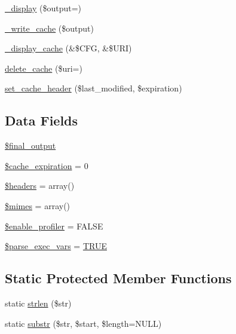 \begin{DoxyCompactItemize}
\mbox{\hyperlink{class_c_i___output_acc6949872b39347a6314db4bc8c45c50}{\+\_\+display}} (\$output=\textquotesingle{}\textquotesingle{})
\item 
\mbox{\hyperlink{class_c_i___output_a772aa9eb3f60f66fa194443ca0bdd8a4}{\+\_\+write\+\_\+cache}} (\$output)
\item 
\mbox{\hyperlink{class_c_i___output_acce78bdac02df9ab196a9c5939f6c4ab}{\+\_\+display\+\_\+cache}} (\&\$C\+FG, \&\$U\+RI)
\item 
\mbox{\hyperlink{class_c_i___output_a475c83a7e4d2f7162032c01279c161b4}{delete\+\_\+cache}} (\$uri=\textquotesingle{}\textquotesingle{})
\item 
\mbox{\hyperlink{class_c_i___output_acd24befdfc26233abfbdc62071dcd58b}{set\+\_\+cache\+\_\+header}} (\$last\+\_\+modified, \$expiration)
\end{DoxyCompactItemize}
\subsection*{Data Fields}
\begin{DoxyCompactItemize}
\item 
\mbox{\hyperlink{class_c_i___output_aa1b5049c03b9ef373af010aa3cda17a3}{\$final\+\_\+output}}
\item 
\mbox{\hyperlink{class_c_i___output_a4a65b5005fdb96d5bdac5d642a022f16}{\$cache\+\_\+expiration}} = 0
\item 
\mbox{\hyperlink{class_c_i___output_a52500036ee807241b8b4b7e2367c49ef}{\$headers}} = array()
\item 
\mbox{\hyperlink{class_c_i___output_a2ce7d338d1fd0f0d971ba6213ac298a2}{\$mimes}} = array()
\item 
\mbox{\hyperlink{class_c_i___output_a85f3ab9485440090efd4e0ae9a070747}{\$enable\+\_\+profiler}} = F\+A\+L\+SE
\item 
\mbox{\hyperlink{class_c_i___output_a254d73d122352494697cdba0c509086d}{\$parse\+\_\+exec\+\_\+vars}} = \mbox{\hyperlink{constants_8php_ae04a3efe6aa42044f803ee90c2277846}{T\+R\+UE}}
\end{DoxyCompactItemize}
\subsection*{Static Protected Member Functions}
\begin{DoxyCompactItemize}
\item 
static \mbox{\hyperlink{class_c_i___output_a4c29a687d4ed62c26a10e41d98930d5f}{strlen}} (\$str)
\item 
static \mbox{\hyperlink{class_c_i___output_a101caef57ef0b165da5747e2c2e6c9dc}{substr}} (\$str, \$start, \$length=N\+U\+LL)
\end{DoxyCompactItemize}
